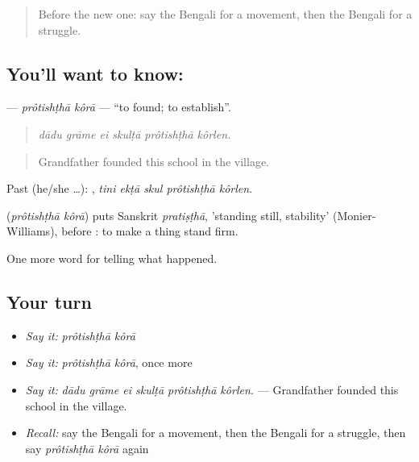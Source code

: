 \label{lesson:BN-C318-protishtha-kora}



\begin{quote}
Before the new one: say the Bengali for a movement, then the Bengali for a struggle.
\end{quote}

\subsection*{You'll want to know:  }
\textbf{ } — \emph{prôtishṭhā kôrā} — \textquotedblleft{}to found; to establish\textquotedblright{}.

\begin{quote}
     
\end{quote}

\begin{quote}
\emph{dādu grāme ei skulṭā prôtishṭhā kôrlen.}
\end{quote}

\begin{quote}
Grandfather founded this school in the village.
\end{quote}

Past (he/she …):     , \emph{tini ekṭā skul prôtishṭhā kôrlen}.

\begin{cousinweb}
\textbf{ } (\emph{prôtishṭhā kôrā}) puts Sanskrit \emph{pratiṣṭhā}, 'standing still, stability' (Monier-Williams), before : to make a thing stand firm.
\end{cousinweb}

\begin{grammarlens}[title={What you've built}]
One more word for telling what happened.
\end{grammarlens}

\subsection*{Your turn}
\begin{itemize}
\raggedright
  \item \emph{Say it:} \emph{prôtishṭhā kôrā}
  \item \emph{Say it:} \emph{prôtishṭhā kôrā}, once more
  \item \emph{Say it:} \emph{dādu grāme ei skulṭā prôtishṭhā kôrlen.} — Grandfather founded this school in the village.
  \item \emph{Recall:} say the Bengali for a movement, then the Bengali for a struggle, then say \emph{prôtishṭhā kôrā} again
\end{itemize}

